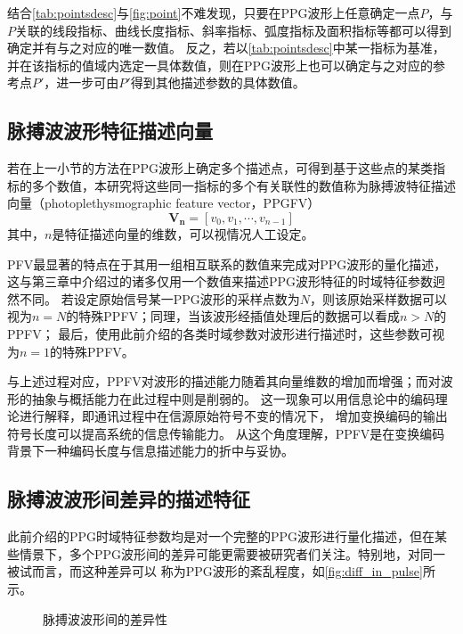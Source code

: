 结合\autoref{tab:pointsdesc}与\autoref{fig:point}不难发现，只要在PPG波形上任意确定一点$P$，与$P$关联的线段指标、曲线长度指标、斜率指标、弧度指标及面积指标等都可以得到确定并有与之对应的唯一数值。
反之，若以\autoref{tab:pointsdesc}中某一指标为基准，并在该指标的值域内选定一具体数值，则在PPG波形上也可以确定与之对应的参考点$P'$，进一步可由$P'$得到其他描述参数的具体数值。

\subsection{脉搏波波形特征描述向量}

若在上一小节的方法在PPG波形上确定多个描述点，可得到基于这些点的某类指标的多个数值，本研究将这些同一指标的多个有关联性的数值称为脉搏波特征描述向量（photoplethysmographic feature vector，PPGFV）
\begin{equation}
  \label{equ:featurevector}
  \boldsymbol {V_n}=[v_0,v_1,\cdots,v_{n-1}]
\end{equation}
其中，$n$是特征描述向量的维数，可以视情况人工设定。

PFV最显著的特点在于其用一组相互联系的数值来完成对PPG波形的量化描述，这与第三章中介绍过的诸多仅用一个数值来描述PPG波形特征的时域特征参数迥然不同。
若设定原始信号某一PPG波形的采样点数为$N$，则该原始采样数据可以视为$n=N$的特殊PPFV；同理，当该波形经插值处理后的数据可以看成$n>N$的PPFV；
最后，使用此前介绍的各类时域参数对波形进行描述时，这些参数可视为$n=1$的特殊PPFV。

与上述过程对应，PPFV对波形的描述能力随着其向量维数的增加而增强；而对波形的抽象与概括能力在此过程中则是削弱的。
这一现象可以用信息论中的编码理论进行解释，即通讯过程中在信源原始符号不变的情况下，
增加变换编码的输出符号长度可以提高系统的信息传输能力\cite{Zhao2017}。
从这个角度理解，PPFV是在变换编码背景下一种编码长度与信息描述能力的折中与妥协。

\subsection{脉搏波波形间差异的描述特征}
此前介绍的PPG时域特征参数均是对一个完整的PPG波形进行量化描述，但在某些情景下，多个PPG波形间的差异可能更需要被研究者们关注。特别地，对同一被试而言，而这种差异可以
称为PPG波形的紊乱程度，如\autoref{fig:diff_in_pulse}所示。

\begin{figure}[htbp]
  \centering
  \quad
  \caption[脉搏波波形间的差异性]{\label{fig:diff_in_pulse}脉搏波波形间的差异性}
\end{figure}

